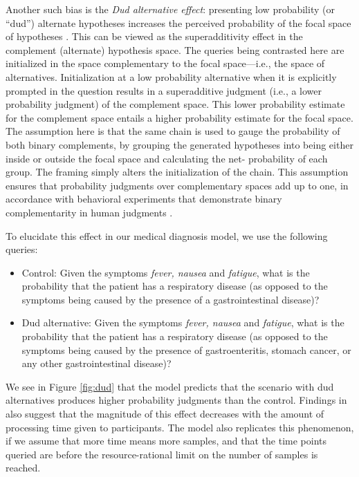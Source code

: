 Another such bias is the \emph{Dud alternative effect}: presenting low probability (or ``dud'') alternate hypotheses increases the perceived probability of the focal space of hypotheses \citep{dud}. This can be viewed as the superadditivity effect in the complement (alternate) hypothesis space. The queries being contrasted here are initialized in the space complementary to the focal space---i.e., the space of alternatives. Initialization at a low probability alternative when it is explicitly prompted in the question results in a superadditive judgment (i.e., a lower probability judgment) of the complement space. This lower probability estimate for the complement space entails a higher probability estimate for the focal space.
The assumption here is that the same chain is used to gauge the probability of both binary complements, by grouping the generated hypotheses into being either inside or outside the focal space and calculating the net- probability of each group. The framing simply alters the initialization of the chain. This assumption ensures that probability judgments over complementary spaces add up to one, in accordance with behavioral experiments that demonstrate binary complementarity in human judgments \citep{tversky94}.

To elucidate this effect in our medical diagnosis model, we use the following queries:
\begin{itemize}
\item Control: Given the symptoms \emph{fever, nausea} and \emph{fatigue}, what is the probability that the patient has a respiratory disease (as opposed to the symptoms being caused by the presence of a gastrointestinal disease)?
\item Dud alternative: Given the symptoms \emph{fever, nausea} and \emph{fatigue}, what is the probability that the patient has a respiratory disease (as opposed to the symptoms being caused by the presence of gastroenteritis, stomach cancer, or any other gastrointestinal disease)?
\end{itemize}
We see in Figure \ref{fig:dud} that the model predicts that the scenario with dud alternatives produces higher probability judgments than the control. Findings in \cite{dud} also suggest that the magnitude of this effect decreases with the amount of processing time given to participants. The model also replicates this phenomenon, if we assume that more time means more samples, and that the time points queried are before the resource-rational limit on the number of samples is reached.

